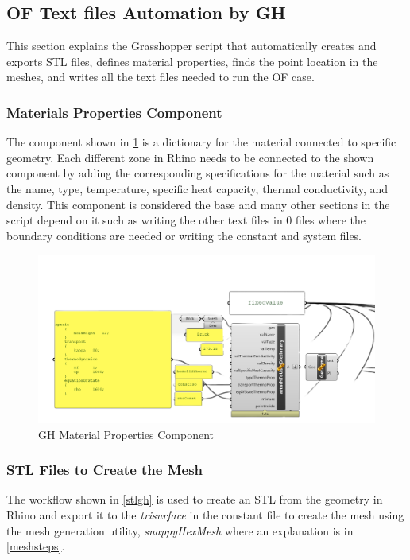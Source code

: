 \subsection{OF Text files Automation by GH}   
This section explains the Grasshopper script that automatically creates and exports STL files, defines material properties, finds the point location in the meshes, and writes all the text files needed to run the OF case.

\subsubsection{Materials Properties Component}
The component shown in \ref{matgh} is a dictionary for the material connected to specific geometry. Each different zone in Rhino needs to be connected to the shown component by adding the corresponding specifications for the material such as the name, type, temperature, specific heat capacity, thermal conductivity, and density. This component is considered the base and many other sections in the script depend on it such as writing the other text files in 0 files where the boundary conditions are needed or writing the constant and system files. 


\begin{figure}[H]
\centering
\includegraphics[width=0.77\columnwidth]{Figures/materialgh.png}
\hspace{0.7cm}
\caption{GH Material Properties Component}
\label{matgh}
\end{figure}



\subsubsection{STL Files to Create the Mesh}
The workflow shown in \ref{stlgh} is used to create an STL from the geometry in Rhino and export it to the \textit{trisurface} in the constant file to create the mesh using the mesh generation utility, \textit{snappyHexMesh} where an explanation is in \ref{meshsteps}.


